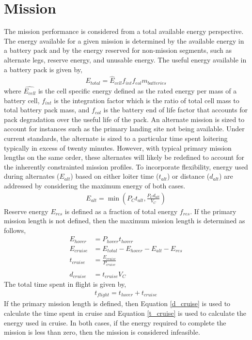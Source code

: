 \documentclass[12pt, letter]{article}
\begin{document}
\section{Mission}
The mission performance is considered from a total available energy perspective. The energy available for a given mission is determined by the available energy in a battery pack and by the energy reserved for non-mission segments, such as alternate legs, reserve energy, and unusable energy. The useful energy available in a battery pack is given by,
\begin{align}
	E_{total}=\hat{E}_{cell} f_{int} f_{eol} m_{batteries}
\end{align}
where $\hat{E_{cell}}$ is the cell specific energy defined as the rated energy per mass of a battery cell, $f_{int}$ is the integration factor which is the ratio of total cell mass to total battery pack mass, and $f_{eol}$ is the battery end of life factor that accounts for pack degradation over the useful life of the pack. An alternate mission is sized to account for instances such as the primary landing site not being available. Under current standards, the alternate is sized to a particular time spent loitering typically in excess of twenty minutes. However, with typical primary mission lengths on the same order, these alternates will likely be redefined to account for the inherently constrainted mission profiles. To incorporate flexibility, energy used during alternates ($E_{alt}$) based on either loiter time ($t_{alt}$) or distance ($d_{alt}$) are addressed by considering the maximum energy of both cases.
\begin{align}
	E_{alt}=\min \left({P_C t_{alt}, \frac{P_C d_{alt}}{V_C}}\right)
\end{align}
Reserve energy $E_{res}$ is defined as a fraction of total energy $f_{res}$. If the primary mission length is not defined, then the maximum mission length is determined as follows,
\begin{align}
	E_{hover}	 &= P_{hover} t_{hover} \\
	E_{cruise} &= E_{total} - E_{hover} - E_{alt} - E_{res} \\ 
	t_{cruise} &= \frac{E_{cruise}}{P_{cruise}} \\ \label{t_cruise} \\
	d_{cruise} &= t_{cruise} V_C \label{d_cruise}
\end{align}
The total time spent in flight is given by,
\begin{align}
	t_{flight}=t_{hover}+t_{cruise}
\end{align}
If the primary mission length is defined, then Equation \ref{d_cruise} is used to calculate the time spent in cruise and Equation \ref{t_cruise} is used to calculate the energy used in cruise. In both cases, if the energy required to complete the mission is less than zero, then the mission is considered infeasible. 
\end{document}
